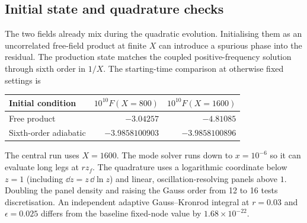 \subsection{Initial state and quadrature checks}
The two fields already mix during the quadratic evolution. Initialising them as an uncorrelated free-field product at finite $X$ can introduce a spurious phase into the residual. The production state matches the coupled positive-frequency solution through sixth order in $1/X$. The starting-time comparison at otherwise fixed settings is
\begin{center}\begin{tabular}{lrr}\toprule Initial condition & $10^{10}F(X=800)$ & $10^{10}F(X=1600)$\\\midrule
Free product & $-3.04257$ & $-4.81085$\\
Sixth-order adiabatic & $-3.9858100903$ & $-3.9858100896$\\\bottomrule\end{tabular}\end{center}
The central run uses $X=1600$. The mode solver runs down to $x=10^{-6}$ so it can evaluate long legs at $rz_f$. The quadrature uses a logarithmic coordinate below $z=1$ (including $\dd z=z\,\dd\ln z$) and linear, oscillation-resolving panels above $1$. Doubling the panel density and raising the Gauss order from 12 to 16 tests discretisation. An independent adaptive Gauss--Kronrod integral at $r=0.03$ and $\epsilon=0.025$ differs from the baseline fixed-node value by $1.68\times10^{-22}$.

